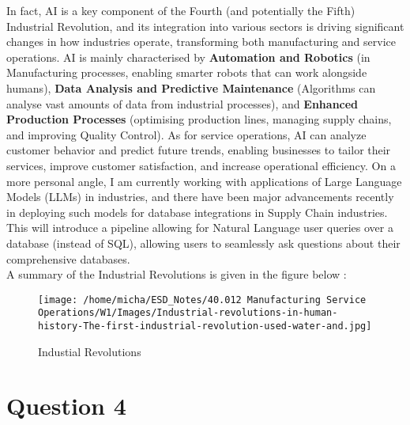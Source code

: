 \documentclass[12pt]{article}
\begin{document}
In fact, AI is a key component of the Fourth (and potentially the Fifth) Industrial Revolution, and its integration into various sectors is driving significant changes in how industries operate, transforming both manufacturing and service operations. AI is mainly characterised by \textbf{Automation and Robotics} (in Manufacturing processes, enabling smarter robots that can work alongside humans), \textbf{Data Analysis and Predictive Maintenance} (Algorithms can analyse vast amounts of data from industrial processes), and \textbf{Enhanced Production Processes} (optimising production lines, managing supply chains, and improving Quality Control). As for service operations, AI can analyze customer behavior and predict future trends, enabling businesses to tailor their services, improve customer satisfaction, and increase operational efficiency. On a more personal angle, I am currently working with applications of Large Language Models (LLMs) in industries, and there have been major advancements recently in deploying such models for database integrations in Supply Chain industries. This will introduce a pipeline allowing for Natural Language user queries over a database (instead of SQL), allowing users to seamlessly ask questions about their comprehensive databases. \\ 

\noindent A summary of the Industrial Revolutions is given in the figure below \cite{article}: 

\begin{figure}[H]
    \centering
    \texttt{[image: /home/micha/ESD\_Notes/40.012 Manufacturing Service Operations/W1/Images/Industrial-revolutions-in-human-history-The-first-industrial-revolution-used-water-and.jpg]}
    \caption{Industial Revolutions}
    \label{fig:3-industrialrevolutions}
\end{figure} 

\newpage

\section*{Question 4}

\end{document}
